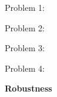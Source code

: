 


\begin{userprompt}[title={Answer}]
Problem 1: 

Problem 2: 

Problem 3: 

Problem 4: 
\end{userprompt}

\textbf{Robustness}



